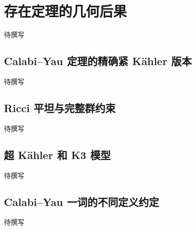 
% 
% 

\section{存在定理的几何后果}
\label{g4:sec:3104}

待撰写

\subsection{Calabi–Yau 定理的精确紧 Kähler 版本}
\label{g4:subsec:3104:01}
待撰写

\subsection{Ricci 平坦与完整群约束}
\label{g4:subsec:3104:02}
待撰写

\subsection{超 Kähler 和 K3 模型}
\label{g4:subsec:3104:03}
待撰写

\subsection{Calabi–Yau 一词的不同定义约定}
\label{g4:subsec:3104:04}
待撰写
